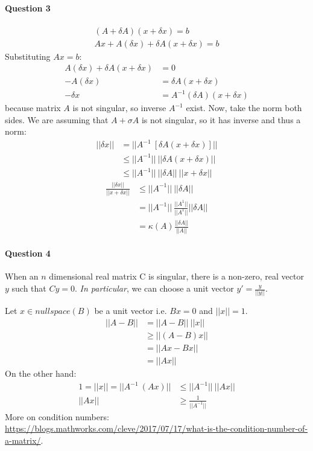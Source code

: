 \paragraph{Question 3}
\begin{align*}
    (A+ \delta A)(x+ \delta x) = b \\
    Ax + A(\delta x) + \delta A(x+ \delta x) = b
\end{align*}
Substituting $Ax = b$:
\begin{align*}
    A(\delta x) + \delta A(x+ \delta x) &= 0 \\
    - A(\delta x) &= \delta A(x+ \delta x) \\
    -\delta x &= A^{-1} (\delta A)(x+ \delta x)
\end{align*}
because matrix $A$ is not singular, so inverse $A^{-1}$ exist.
Now, take the norm both sides.
We are assuming that $A + \sigma A$ is not singular, so it has inverse and thus a norm:
\begin{align*}
    ||\delta x || &= || A^{-1} \: [\delta A(x+ \delta x) ]|| \\
      &\leq || A^{-1} ||  \: || \delta A(x+ \delta x) || \\
      &\leq || A^{-1} ||  \: || \delta A || \: || x + \delta x ||
\end{align*}
\begin{align*}
    \frac{||\delta x ||}{ || x + \delta x || } &\leq || A^{-1} ||  \: || \delta A || \\
    &= || A^{-1} || \:  \frac{|| A^{1} || }{|| A^{1} ||} || \delta A || \\
    &= \kappa(A) \frac{||\delta A||}{||A||}
\end{align*}

\paragraph{Question 4}
When an $n$ dimensional real matrix C is singular, there is a non-zero, real vector $y$ such that $Cy = 0$. 
\textit{In particular}, we can choose a unit vector $y' = \frac{y}{||y||}$. 

Let $x \in nullspace(B)$ be a unit vector i.e. $Bx = 0$ and $||x|| = 1$.
\begin{align*}
    ||A-B|| &= ||A-B|| \: ||x|| \\
            &\geq || (A-B)x || \\
            &= ||Ax - Bx|| \\
            &= ||Ax||
\end{align*}
On the other hand:
\begin{align*}
    1 = ||x|| = || A^{-1} \:(Ax) || &\leq || A^{-1} || \: ||Ax|| \\
    ||Ax|| &\geq \frac{1}{||A^{-1}||}
\end{align*}
More on condition numbers:\newline
\url{https://blogs.mathworks.com/cleve/2017/07/17/what-is-the-condition-number-of-a-matrix/}.